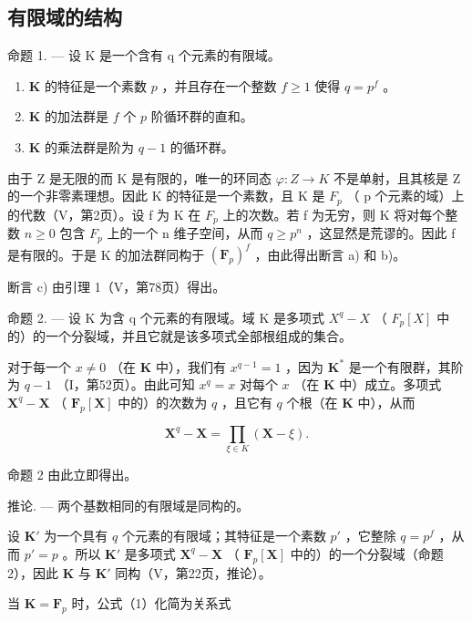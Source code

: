 \subsection{有限域的结构}

命题 1. --- 设 K 是一个含有 q 个元素的有限域。

\begin{enumerate}
\def\labelenumi{\alph{enumi})}
\item
  \(\mathbf{K}\) 的特征是一个素数 \(p\) ，并且存在一个整数 \(f \geqslant 1\) 使得 \(q = p^f\) 。
\item
  \(\mathbf{K}\) 的加法群是 \(f\) 个 \(p\) 阶循环群的直和。
\item
  \(\mathbf{K}\) 的乘法群是阶为 \(q - 1\) 的循环群。
\end{enumerate}

由于 Z 是无限的而 K 是有限的，唯一的环同态 \(\varphi:Z\to K\) 不是单射，且其核是 Z 的一个非零素理想。因此 K 的特征是一个素数，且 K 是 \(F_{p}\) （ p 个元素的域）上的代数（V，第2页）。设 f 为 K 在 \(F_{p}\) 上的次数。若 f 为无穷，则 K 将对每个整数 \(n\geqslant0\) 包含 \(F_{p}\) 上的一个 n 维子空间，从而 \(q\geqslant p^{n}\) ，这显然是荒谬的。因此 f 是有限的。于是 K 的加法群同构于 \((\mathbf{F}_{p})^{f}\) ，由此得出断言 a) 和 b)。

断言 c) 由引理 1（V，第78页）得出。

命题 2. --- 设 K 为含 q 个元素的有限域。域 K 是多项式 \(X^{q}-X\) （ \(F_{p}[X]\) 中的）的一个分裂域，并且它就是该多项式全部根组成的集合。

对于每一个 \(x \neq 0\) （在 \(\mathbf{K}\) 中），我们有 \(x^{q-1} = 1\) ，因为 \(\mathbf{K}^*\) 是一个有限群，其阶为 \(q - 1\) （I，第52页）。由此可知 \(x^q = x\) 对每个 \(x\) （在 \(\mathbf{K}\) 中）成立。多项式 \(\mathbf{X}^q - \mathbf{X}\) （ \(\mathbf{F}_p[\mathbf{X}]\) 中的）的次数为 \(q\) ，且它有 \(q\) 个根（在 \(\mathbf{K}\) 中），从而

\[
\mathbf {X} ^ {q} - \mathbf {X} = \prod_ {\xi \in K} (\mathbf {X} - \xi).\tag{1}
\]

命题 2 由此立即得出。

推论. --- 两个基数相同的有限域是同构的。

设 \(\mathbf{K}'\) 为一个具有 \(q\) 个元素的有限域；其特征是一个素数 \(p'\) ，它整除 \(q = p^f\) ，从而 \(p' = p\) 。所以 \(\mathbf{K}'\) 是多项式 \(\mathbf{X}^q - \mathbf{X}\) （ \(\mathbf{F}_p[\mathbf{X}]\) 中的）的一个分裂域（命题 2），因此 \(\mathbf{K}\) 与 \(\mathbf{K}'\) 同构（V，第22页，推论）。

当 \(\mathbf{K} = \mathbf{F}_p\) 时，公式（1）化简为关系式

